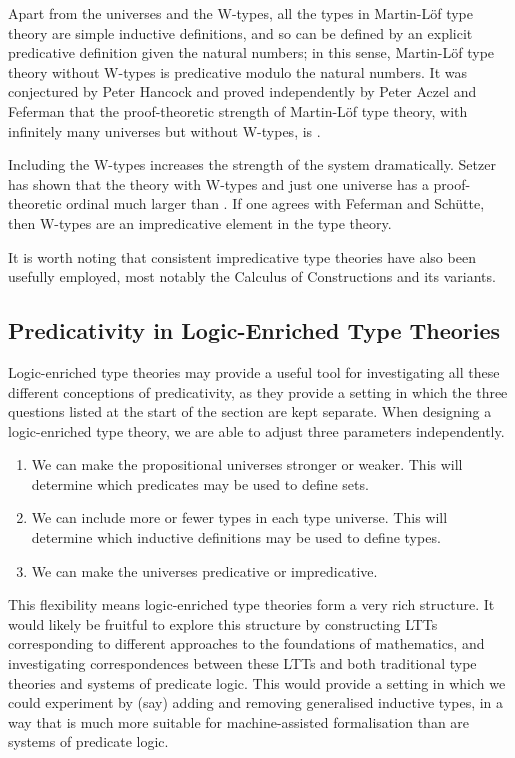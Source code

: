 \documentclass[acmtocl]{acmtrans2m}
\begin{document}
Apart from the universes and the W-types, all the types in
Martin-L\"of type theory are simple inductive definitions, and so
can be defined by an explicit predicative definition given the
natural numbers; in this sense, Martin-L\"of type theory without
W-types is predicative modulo the natural numbers.  It was
conjectured by Peter Hancock \cite{ml:ittpp} and proved independently by Peter
Aczel and Feferman \cite{feferman:iifpt} that the proof-theoretic
strength of Martin-L\"of type theory, with infinitely many universes
but without W-types, is .

Including the W-types  increases the strength of the system dramatically.  Setzer  has shown that the theory with W-types and just one universe has a proof-theoretic ordinal much larger than .  If one agrees with Feferman and Sch\"utte, then W-types are an impredicative element in the type theory.

It is worth noting that consistent impredicative type theories have also been usefully employed, most notably the Calculus of Constructions \cite{ch:coc} and its variants.

\subsection{Predicativity in Logic-Enriched Type Theories}

Logic-enriched type theories may provide a useful tool for investigating all these different conceptions of predicativity, as they provide a setting in which the three questions listed at the start of the section are kept separate.  When designing a logic-enriched type theory, we are able to adjust three parameters independently.
\begin{enumerate}
 \item We can make the propositional universes stronger or weaker.  This will determine which predicates may be used to define sets.
\item We can include more or fewer types in each type universe.  This will determine which inductive definitions may be used to define types.
\item We can make the universes predicative or impredicative.
\end{enumerate}
This flexibility means logic-enriched type theories form a very rich structure.  It would likely be fruitful to explore this structure by constructing LTTs corresponding to different approaches to the foundations of mathematics, and investigating correspondences between these LTTs and both traditional type theories and systems of predicate logic.  This would provide a setting in which we could experiment by (say) adding and removing generalised inductive types, in a way that is much more suitable for machine-assisted formalisation than are systems of predicate logic.
\end{document}
